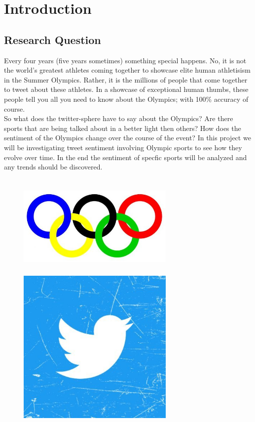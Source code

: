 \documentclass[12pt]{article}
\begin{document}
    \tableofcontents

    \section{Introduction}
        \subsection{Research Question}
            Every four years (five years sometimes) something special happens. No, it is not the world's greatest athletes coming together to showcase elite human athletisism in the Summer 
            Olympics. Rather, it is the millions of people that come together to tweet about these athletes. In a showcase of exceptional human thumbs, these people tell you all you need to know
            about the Olympics; with 100\% accuracy of course.\\ 

            So what does the twitter-sphere have to say about the Olympics? Are there sports that are being talked about in a better light then others? How does the sentiment of the Olympics 
            change over the course of the event? In this project we will be investigating tweet sentiment involving Olympic sports to see how they evolve over time. In the end the sentiment of 
            specfic sports will be analyzed and any trends should be discovered.

            \begin{figure}[htp]
                \includegraphics[width=3in, height=2in]{Rings2.jpg}
                \hspace{0.25in}
                \includegraphics[width=3in, height=3in]{Twitter.jpg}
            \end{figure}
\end{document}

